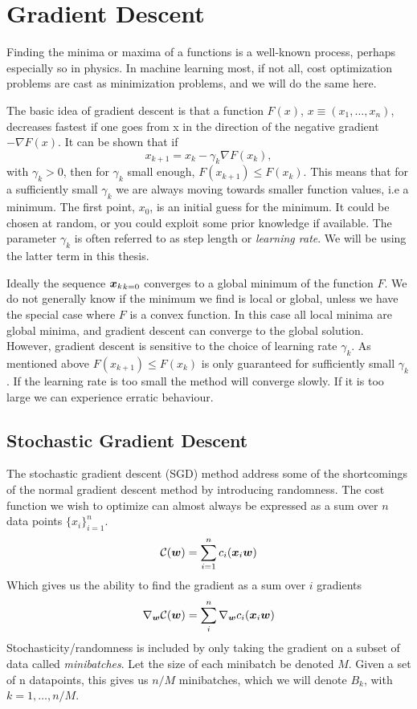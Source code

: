 \section{Gradient Descent}\label{sec:gradient-descent}
Finding the minima or maxima of a functions is a well-known process, perhaps especially
so in physics. In machine learning most, if not all, cost optimization problems are
cast as minimization problems, and we will do the same here.

The basic idea of gradient descent is that a function $F(x)$, $x\equiv(x_1,\dots,x_n)$,
decreases fastest if one goes from x in the direction of the negative gradient $-\nabla F(x)$.
It can be shown that if
$$x_{k+1} = x_k - \gamma_k \nabla F(x_k),$$
with $\gamma_k > 0$, then for $\gamma_k$ small enough, $F(x_{k+1}) \leq F(x_k)$.
This means that for a sufficiently small $\gamma_k$ we are always moving 
towards smaller function values, i.e a minimum. The first point, $x_0$, is an
initial guess for the minimum. It could be chosen at random, or you could exploit some
prior knowledge if available. The parameter $\gamma_k$ is often
referred to as step length or \textit{learning rate}. We will be using the latter 
term in this thesis.

Ideally the sequence ${{\boldsymbol{x}}_k}_{k=0}$ converges to a global minimum of the function 
$F$. We do not generally know if the minimum we find is local or global,
unless we have the special case where $F$ is a convex function. In this case all
local minima are global minima, and gradient descent can converge to the global
solution. However, gradient descent is sensitive to the choice of learning rate $\gamma_k$.
As mentioned above $F(x_{k+1}) \leq F(x_k)$ is only guaranteed for sufficiently small
$\gamma_k$. If the learning rate is too small the method will converge slowly. If it
is too large we can experience erratic behaviour.

\subsection{Stochastic Gradient Descent}\label{sec:SGD}
The stochastic gradient descent (SGD) method address some of the shortcomings
of the normal gradient descent method by introducing randomness.
The cost function we wish to optimize can almost always be expressed as a sum
over $n$ data points $\{x_i\}_{i=1}^n$.
\begin{equation}
	\mathcal{C}({\boldsymbol{w}}) = \sum\limits_{i=1}^n c_i ({\boldsymbol{x}}_i{\boldsymbol{w}})
\end{equation}
Which gives us the ability to find the gradient as a sum over $i$ gradients
\begin{equation}
	\nabla_{{\boldsymbol{w}}} \mathcal{C}({\boldsymbol{w}}) = \sum\limits_{i}^n \nabla_{{\boldsymbol{w}}}c_i ({\boldsymbol{x}}_i{\boldsymbol{w}})
\end{equation}
Stochasticity/randomness is included by only taking the gradient on a subset of data
called \textit{minibatches}. Let the size of each minibatch be denoted $M$. Given a
set of n datapoints, this gives us $n/M$ minibatches, which we will denote $B_k$,
with $k = 1, \dots, n/M$.

